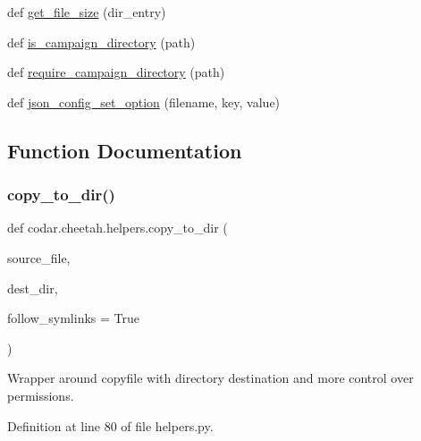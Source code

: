 \begin{DoxyCompactItemize}
\item 
def \hyperlink{namespacecodar_1_1cheetah_1_1helpers_a8e310d521f50d49d9c9732da40b62b07}{get\+\_\+file\+\_\+size} (dir\+\_\+entry)
\item 
def \hyperlink{namespacecodar_1_1cheetah_1_1helpers_a775ff4e04d63a594d5c46e780c452303}{is\+\_\+campaign\+\_\+directory} (path)
\item 
def \hyperlink{namespacecodar_1_1cheetah_1_1helpers_aa9102ed0be6e19d1c3756434968ac817}{require\+\_\+campaign\+\_\+directory} (path)
\item 
def \hyperlink{namespacecodar_1_1cheetah_1_1helpers_a21131ccd55ec0fd06dfbc8ecbce83366}{json\+\_\+config\+\_\+set\+\_\+option} (filename, key, value)
\end{DoxyCompactItemize}


\subsection{Function Documentation}
\mbox{\label{namespacecodar_1_1cheetah_1_1helpers_a229590ddcb3ea80584a1bd54503b852d}} 
\subsubsection{\texorpdfstring{copy\+\_\+to\+\_\+dir()}{copy\_to\_dir()}}
{\footnotesize\ttfamily def codar.\+cheetah.\+helpers.\+copy\+\_\+to\+\_\+dir (\begin{DoxyParamCaption}\item[{}]{source\+\_\+file,  }\item[{}]{dest\+\_\+dir,  }\item[{}]{follow\+\_\+symlinks = {\ttfamily True} }\end{DoxyParamCaption})}

\begin{DoxyVerb}Wrapper around copyfile with directory destination and more
control over permissions.\end{DoxyVerb}
 

Definition at line 80 of file helpers.\+py.

\mbox{\label{namespacecodar_1_1cheetah_1_1helpers_a0d950b9349d81a66ee6ceb2f6d527f27}} 
